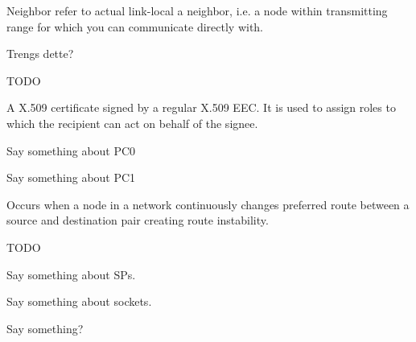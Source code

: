 \begin{acronym}
	Neighbor refer to actual link-local a neighbor, i.e. a node within
	transmitting range for which you can communicate directly with.

	Trengs dette?




	TODO

	A X.509 certificate signed by a regular X.509 EEC. It is used to assign roles
	to which the recipient can act on behalf of the signee.

	Say something about PC0
	
	Say something about PC1
	
	


	Occurs when a node in a network continuously changes preferred route between a
	source and destination pair creating route instability.


	TODO

	Say something about SPs.


	Say something about sockets.

	Say something?


\end{acronym}
